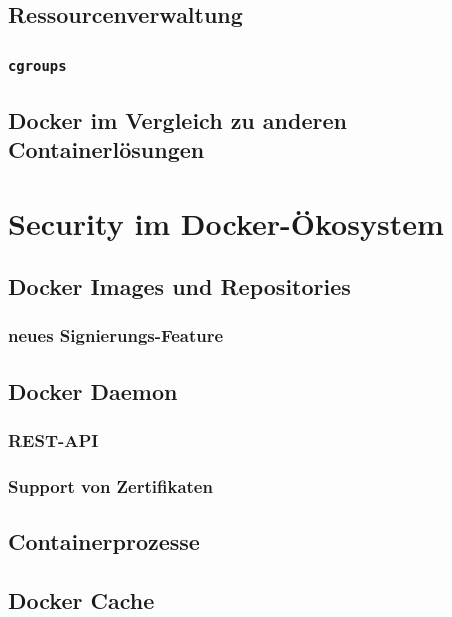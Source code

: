 \documentclass[11pt,a4paper,oneside]{report}
\begin{document}
	\section{Ressourcenverwaltung}
		\subsection{\texttt{cgroups}}
	\section{Docker im Vergleich zu anderen Containerlösungen}
\chapter{Security im Docker-Ökosystem}
  \section{Docker Images und Repositories}
		\subsection{neues Signierungs-Feature}
	\section{Docker Daemon}
		\subsection{REST-API}
		\subsection{Support von Zertifikaten}
  \section{Containerprozesse}
	\section{Docker Cache}
\end{document}
